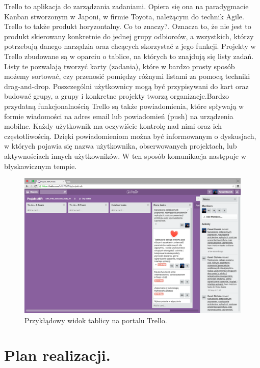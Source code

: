\documentclass[a4paper,12pt]{article}		%
\begin{document}
Trello to aplikacja do zarządzania zadaniami. Opiera się ona na paradygmacie Kanban stworzonym w Japoni, w firmie Toyota, należącym do technik Agile. Trello to także produkt horyzontalny. Co to znaczy?. Oznacza to, że nie jest to produkt skierowany konkretnie do jednej grupy odbiorców, a wszystkich, którzy potrzebują danego narzędzia oraz chcących skorzystać z jego funkcji. Projekty w Trello zbudowane są w oparciu o tablice, na których to znajdują się listy zadań. Listy te pozwalają tworzyć karty (zadania), które w bardzo prosty sposób możemy sortować, czy przenosić pomiędzy różnymi listami za pomocą techniki drag-and-drop. Poszczególni użytkownicy mogą być przypisywani do kart oraz budować grupy, a grupy i konkretne projekty tworzą organizacje.Bardzo przydatną funkcjonalnością Trello są także powiadomienia, które spływają w formie wiadomości na adres email lub powiadomień (push) na urządzenia mobilne. Każdy użytkownik ma oczywiście kontrolę nad nimi oraz ich częstotliwością. Dzięki powiadomieniom można być informowanym o dyskusjach, w których pojawia się nazwa użytkownika, obserwowanych projektach, lub aktywnościach innych użytkowników. W ten sposób komunikacja następuje w błyskawicznym tempie.

\begin{figure}[h!]
\centering
\includegraphics[scale=0.2]{Resources/Trello_Zrzut.png}
\caption{Przykłądowy widok tablicy na portalu Trello.} 
\end{figure} 
\newpage

\section{Plan realizacji.}
\end{document}
